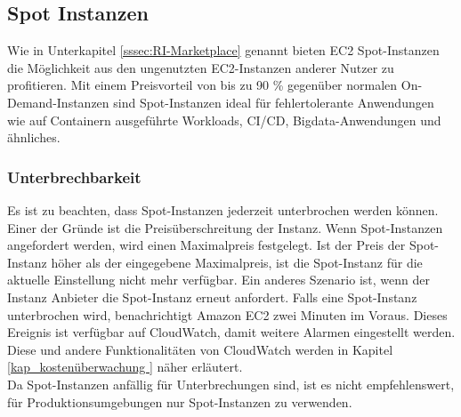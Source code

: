 \subsection{Spot Instanzen }\label{ssec:Spot-Instances}
Wie in Unterkapitel \ref{sssec:RI-Marketplace} genannt bieten EC2 Spot-Instanzen die Möglichkeit aus den ungenutzten EC2-Instanzen anderer Nutzer zu profitieren. 
Mit einem Preisvorteil von bis zu 90 \% gegenüber normalen On-Demand-Instanzen sind Spot-Instanzen ideal für fehlertolerante Anwendungen wie auf Containern ausgeführte Workloads, CI/CD, Bigdata-Anwendungen und ähnliches.

\subsubsection*{Unterbrechbarkeit}
Es ist zu beachten, dass Spot-Instanzen jederzeit unterbrochen werden können. Einer der Gründe ist die Preisüberschreitung der Instanz. Wenn Spot-Instanzen angefordert werden, wird einen Maximalpreis festgelegt. Ist der Preis der Spot-Instanz höher als der eingegebene Maximalpreis, ist die Spot-Instanz für die aktuelle Einstellung nicht mehr verfügbar. Ein anderes Szenario ist, wenn der Instanz Anbieter die Spot-Instanz erneut anfordert. Falls eine Spot-Instanz unterbrochen wird, benachrichtigt Amazon EC2 zwei Minuten im Voraus. Dieses Ereignis ist verfügbar auf CloudWatch, damit weitere Alarmen eingestellt werden. Diese und andere Funktionalitäten von CloudWatch werden in Kapitel \ref{kap_kostenüberwachung } näher erläutert.
\\
Da Spot-Instanzen anfällig für Unterbrechungen sind, ist es nicht empfehlenswert, für Produktionsumgebungen nur Spot-Instanzen zu verwenden.


